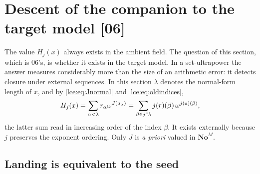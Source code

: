 \documentclass[11pt,letterpaper]{article}
\numberwithin{equation}{section}
\theoremstyle{definition}
\theoremstyle{remark}
\newcommand{\No}{\mathbf{No}}
\newcommand{\imset}[2]{#1\mathbin{``}#2}
\newcommand{\src}[1]{\textup{\textsf{\small[#1]}}}%
\begin{document}
\section{Descent of the companion to the target model \src{06}}
\label{lce:cs:sec:descent}

The value $H_j(x)$ always exists in the ambient field. The question of this
section, which is 06's, is whether it exists in the target model. In a
set-ultrapower the answer measures considerably more than the size of an
arithmetic error: it detects closure under external sequences. In this
section $\lambda$ denotes the normal-form length of $x$, and by
\eqref{lce:eq:Jnormal} and \eqref{lce:eq:oldindices},
\begin{equation}\label{lce:cs:eq:H-nf}
 H_j(x)=\sum_{\alpha<\lambda}r_\alpha\omega^{J(a_\alpha)}
       =\sum_{\beta\in\imset j\lambda}j(r)(\beta)\,\omega^{j(a)(\beta)},
\end{equation}
the latter sum read in increasing order of the index $\beta$. It exists
externally because $j$ preserves the exponent ordering. Only $J$ is
\emph{a priori} valued in $\No^M$.

\subsection{Landing is equivalent to the seed}
\end{document}

